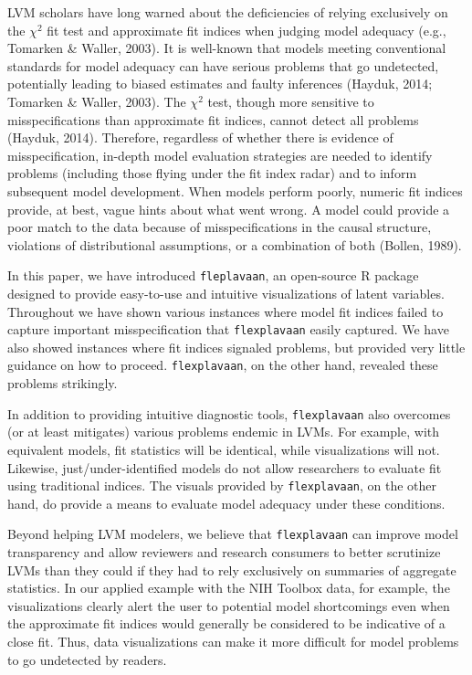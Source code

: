 \documentclass[
  english,
  man]{apa6}
\begin{document}
LVM scholars have long warned about the deficiencies of relying exclusively on the \(\chi^2\) fit test and approximate fit indices when judging model adequacy (e.g., Tomarken \& Waller, 2003). It is well-known that models meeting conventional standards for model adequacy can have serious problems that go undetected, potentially leading to biased estimates and faulty inferences (Hayduk, 2014; Tomarken \& Waller, 2003). The \(\chi^2\) test, though more sensitive to misspecifications than approximate fit indices, cannot detect all problems (Hayduk, 2014). Therefore, regardless of whether there is evidence of misspecification, in-depth model evaluation strategies are needed to identify problems (including those flying under the fit index radar) and to inform subsequent model development. When models perform poorly, numeric fit indices provide, at best, vague hints about what went wrong. A model could provide a poor match to the data because of misspecifications in the causal structure, violations of distributional assumptions, or a combination of both (Bollen, 1989).

In this paper, we have introduced \texttt{fleplavaan}, an open-source R package designed to provide easy-to-use and intuitive visualizations of latent variables. Throughout we have shown various instances where model fit indices failed to capture important misspecification that \texttt{flexplavaan} easily captured. We have also showed instances where fit indices signaled problems, but provided very little guidance on how to proceed. \texttt{flexplavaan}, on the other hand, revealed these problems strikingly.

In addition to providing intuitive diagnostic tools, \texttt{flexplavaan} also overcomes (or at least mitigates) various problems endemic in LVMs. For example, with equivalent models, fit statistics will be identical, while visualizations will not. Likewise, just/under-identified models do not allow researchers to evaluate fit using traditional indices. The visuals provided by \texttt{flexplavaan}, on the other hand, do provide a means to evaluate model adequacy under these conditions.

Beyond helping LVM modelers, we believe that \texttt{flexplavaan} can improve model transparency and allow reviewers and research consumers to better scrutinize LVMs than they could if they had to rely exclusively on summaries of aggregate statistics. In our applied example with the NIH Toolbox data, for example, the visualizations clearly alert the user to potential model shortcomings even when the approximate fit indices would generally be considered to be indicative of a close fit. Thus, data visualizations can make it more difficult for model problems to go undetected by readers.
\end{document}
